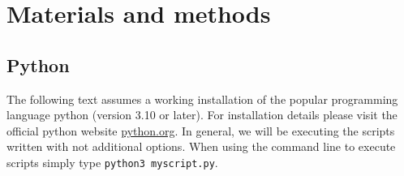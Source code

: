\section*{Materials and methods}
\subsection*{Python}
The following text assumes a working installation of the popular programming language python (version 3.10 or later).
For installation details please visit the official python website \href{https://www.python.org/}{python.org}.
In general, we will be executing the scripts written with not additional options.
When using the command line to execute scripts simply type \texttt{python3 myscript.py}.

